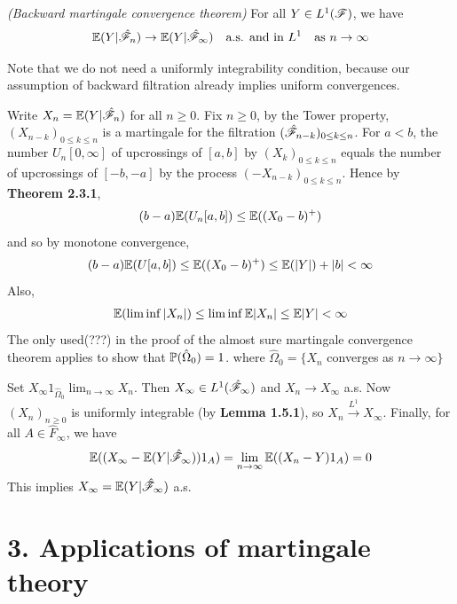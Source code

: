 \documentclass[10pt,a4paper]{report}
\newenvironment{proof}
{\begin{changemargin}{1cm}{0.5cm} 
	}%
	{\end{changemargin}
}
\begin{document}
 \emph{(Backward martingale convergence theorem)} For all $Y\in L^1(\mathscr{F})$, we have 
\begin{align*}
\mathbb{E}(Y|\hat{\mathscr{F}}_n) \rightarrow \mathbb{E}(Y|\hat{\mathscr{F}}_{\infty}) \quad \text{a.s. and in } L^1 \quad \text{as } n\rightarrow \infty
\end{align*}
\s

Note that we do not need a uniformly integrability condition, because our assumption of backward filtration already implies uniform convergences.
\begin{proof}
\pf Write $X_n = \mathbb{E}(Y|\hat{\mathscr{F}}_n)$ for all $n\geq 0$. Fix $n\geq 0$, by the Tower property, $(X_{n-k})_{0\leq k\leq n}$ is a martingale for the filtration $(\hat{\mathscr{F}}_{n-k})_{0\leq k\leq n}$. For $a<b$, the number $U_n[0,\infty]$ of upcrossings of $[a,b]$ by $(X_k)_{0\leq k \leq n}$ equals the number of upcrossings of $[-b,-a]$ by the process $(-X_{n-k})_{0\leq k\leq n}$. Hence by \textbf{Theorem 2.3.1},
\begin{align*}
(b-a)\mathbb{E}(U_n [a,b]) \leq \mathbb{E}((X_0 -b)^+)
\end{align*}
and so by monotone convergence,
\begin{align*}
(b-a) \mathbb{E}(U[a,b]) \leq \mathbb{E}((X_0-b)^+) \leq \mathbb{E}(|Y|) + |b| <\infty
\end{align*}
Also, 
\begin{align*}
\mathbb{E}(\liminf |X_n|) \leq \liminf \mathbb{E}|X_n| \leq \mathbb{E}|Y| < \infty
\end{align*}
The only used(???) in the proof of the almost sure martingale convergence theorem applies to show that $\mathbb{P}(\hat{\Omega}_0)=1$. where $\hat{\Omega}_0 = \{X_n$ converges as $n\rightarrow \infty \}$

\quad Set $X_{\infty} 1_{\hat{\Omega}_0} \lim_{n\rightarrow \infty} X_n$. Then $X_{\infty} \in L^1(\hat{\mathscr{F}}_{\infty})$ and $X_n \rightarrow X_{\infty}$ a.s. Now $(X_n)_{n\geq 0}$ is uniformly integrable (by \textbf{Lemma 1.5.1}), so $X_n\xrightarrow{L^1} X_{\infty}$. Finally, for all $A\in \hat{F}_{\infty}$, we have
\begin{align*}
\mathbb{E}((X_{\infty} - \mathbb{E}(Y|\hat{\mathscr{F}}_{\infty})) 1_A) = \lim_{n\rightarrow \infty} \mathbb{E}((X_n -Y)1_A) = 0
\end{align*}
This implies $X_{\infty} = \mathbb{E}(Y|\hat{\mathscr{F}}_{\infty})$ a.s.

\eop
\end{proof}

\section*{3. Applications of martingale theory}
\end{document}
